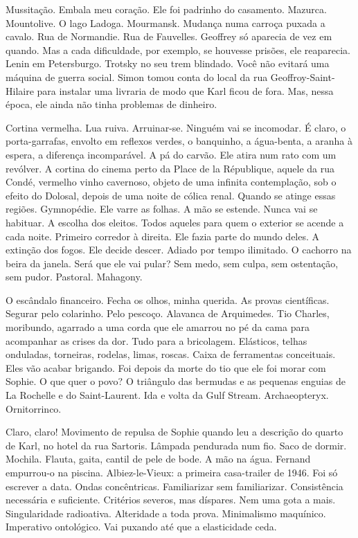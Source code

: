Mussitação. Embala meu coração. Ele foi padrinho do casamento. Mazurca.
Mountolive. O lago Ladoga. Mourmansk. Mudança numa carroça puxada a
cavalo. Rua de Normandie. Rua de Fauvelles. Geoffrey só aparecia de vez
em quando. Mas a cada dificuldade, por exemplo, se houvesse prisões, ele
reaparecia. Lenin em Petersburgo. Trotsky no seu trem blindado. Você não
evitará uma máquina de guerra social. Simon tomou conta do local da rua
Geoffroy-Saint-Hilaire para instalar uma livraria de modo que Karl ficou
de fora. Mas, nessa época, ele ainda não tinha problemas de dinheiro.

Cortina vermelha. Lua ruiva. Arruinar-se. Ninguém vai se incomodar. É
claro, o porta-garrafas, envolto em reflexos verdes, o banquinho, a
água-benta, a aranha à espera, a diferença incomparável. A pá do carvão.
Ele atira num rato com um revólver. A cortina do cinema perto da Place
de la République, aquele da rua Condé, vermelho vinho cavernoso, objeto
de uma infinita contemplação, sob o efeito do Dolosal, depois de uma
noite de cólica renal. Quando se atinge essas regiões. Gymnopédie. Ele
varre as folhas. A mão se estende. Nunca vai se habituar. A escolha dos
eleitos. Todos aqueles para quem o exterior se acende a cada noite.
Primeiro corredor à direita. Ele fazia parte do mundo deles. A extinção
dos fogos. Ele decide descer. Adiado por tempo ilimitado. O cachorro na
beira da janela. Será que ele vai pular? Sem medo, sem culpa, sem
ostentação, sem pudor. Pastoral. Mahagony.

O escândalo financeiro. Fecha os olhos, minha querida. As provas
científicas. Segurar pelo colarinho. Pelo pescoço. Alavanca de
Arquimedes. Tio Charles, moribundo, agarrado a uma corda que ele amarrou
no pé da cama para acompanhar as crises da dor. Tudo para a bricolagem.
Elásticos, telhas onduladas, torneiras, rodelas, limas, roscas. Caixa de
ferramentas conceituais. Eles vão acabar brigando. Foi depois da morte
do tio que ele foi morar com Sophie. O que quer o povo? O triângulo das
bermudas e as pequenas enguias de La Rochelle e do Saint-Laurent. Ida e
volta da Gulf Stream. Archaeopteryx. Ornitorrinco.

Claro, claro! Movimento de repulsa de Sophie quando leu a descrição do
quarto de Karl, no hotel da rua Sartoris. Lâmpada pendurada num fio.
Saco de dormir. Mochila. Flauta, gaita, cantil de pele de bode. A mão na
água. Fernand empurrou-o na piscina. Albiez-le-Vieux: a primeira
casa-trailer de 1946. Foi só escrever a data. Ondas concêntricas.
Familiarizar sem familiarizar. Consistência necessária e suficiente.
Critérios severos, mas díspares. Nem uma gota a mais. Singularidade
radioativa. Alteridade a toda prova. Minimalismo maquínico. Imperativo
ontológico. Vai puxando até que a elasticidade ceda.

